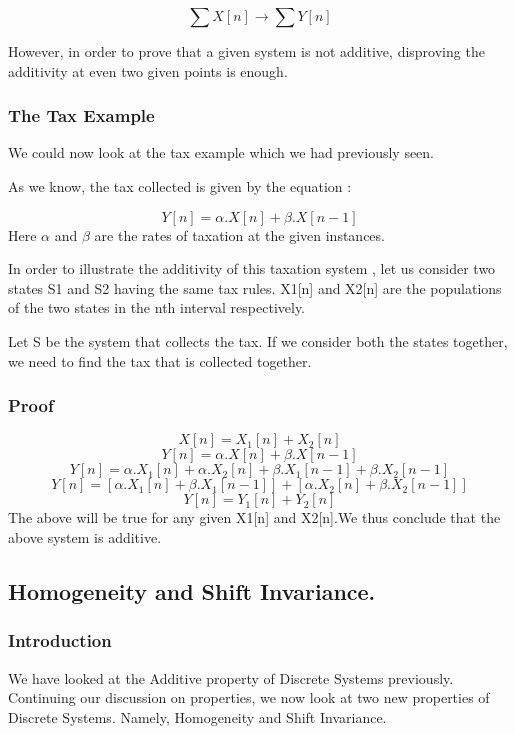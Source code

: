$$\sum X[n]  \rightarrow \sum Y[n]$$

However, in order to prove that a given system is not additive, disproving the additivity at even two given points is enough.




\subsubsection{The Tax Example}
We could now look at the tax example which we had previously seen.

As we know, the tax collected is given by the equation :

$$Y[n] = { \alpha.X[n] +\beta. X[n-1] }$$
Here $\alpha$ and $\beta$ are the rates of taxation at the given instances.

In order to illustrate the additivity of this taxation system , let us consider two states S1 and S2 having the same tax rules. X1[n] and X2[n] are the populations of the two states in the nth interval respectively. 

Let S be the system that collects the tax. If we consider both the states together, we need to find the tax that is collected together.
\subsubsection{Proof}
$$X[n] = {X_1[n] + X_2[n] }$$
$$Y[n] = { \alpha.X[n] +\beta.X[n-1] }$$
$$Y[n] = { \alpha.X_1[n] +\alpha.X_2[n]+\beta. X_1[n-1]+\beta.X_2[n-1] }$$
$$Y[n] = { [{\alpha.X_1[n]+\beta. X_1[n-1]}] +[{\alpha.X_2[n]+\beta.X_2[n-1]}] }$$
$$Y[n] = {Y_1[n] + Y_2[n] }$$
The above will be true for any given X1[n] and X2[n].We thus conclude that the above system is additive.


\pagebreak

\subsection{Homogeneity and Shift Invariance.}

\subsubsection{Introduction}

We have looked at the Additive property of Discrete Systems previously. Continuing our discussion on properties, we now look at two new properties of Discrete Systems. Namely, Homogeneity and Shift Invariance. 



